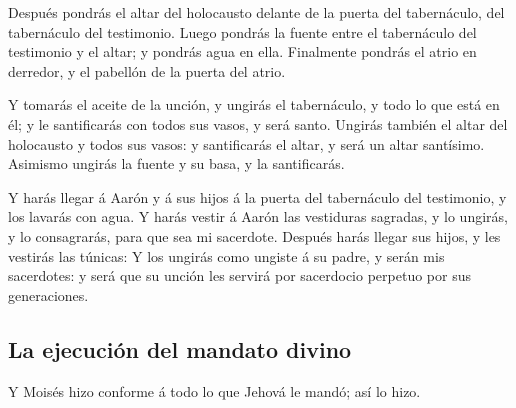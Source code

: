  Después pondrás el altar del holocausto delante de la
puerta del tabernáculo, del tabernáculo del testimonio. 
Luego pondrás la fuente entre el tabernáculo del testimonio y el altar;
y pondrás agua en ella.  Finalmente pondrás el atrio en
derredor, y el pabellón de la puerta del atrio.

 Y tomarás el aceite de la unción, y ungirás el tabernáculo,
y todo lo que está en él; y le santificarás con todos sus vasos, y será
santo.  Ungirás también el altar del holocausto y todos sus
vasos: y santificarás el altar, y será un altar santísimo. 
Asimismo ungirás la fuente y su basa, y la santificarás.

 Y harás llegar á Aarón y á sus hijos á la puerta del
tabernáculo del testimonio, y los lavarás con agua.  Y
harás vestir á Aarón las vestiduras sagradas, y lo ungirás, y lo
consagrarás, para que sea mi sacerdote.  Después harás
llegar sus hijos, y les vestirás las túnicas:  Y los
ungirás como ungiste á su padre, y serán mis sacerdotes: y será que su
unción les servirá por sacerdocio perpetuo por sus generaciones.

\hypertarget{la-ejecuciuxf3n-del-mandato-divino}{%
\subsection{La ejecución del mandato
divino}\label{la-ejecuciuxf3n-del-mandato-divino}}

 Y Moisés hizo conforme á todo lo que Jehová le mandó; así
lo hizo.

